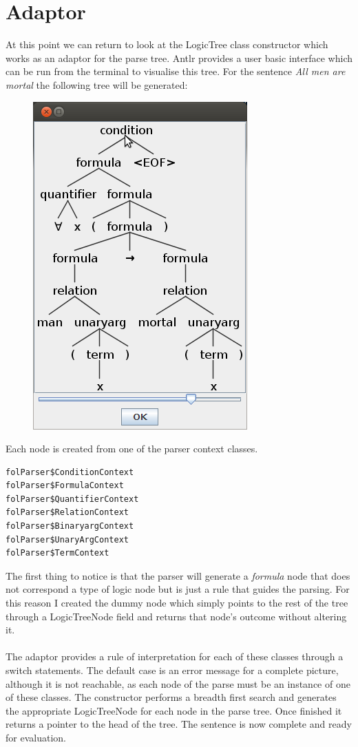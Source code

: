\documentclass{report}
\begin{document}
\section{Adaptor}
At this point we can return to look at the LogicTree class constructor which works as an adaptor for the parse tree. Antlr provides a user basic interface which can be run from the terminal to visualise this tree. For the sentence \emph{All men are mortal} the following tree will be generated:
\begin{figure}[h!]
\centering \includegraphics[scale=0.5]{antlr.png}
\end{figure}
Each node is created from one of the parser context classes. 
\begin{verbatim}
folParser$ConditionContext
folParser$FormulaContext
folParser$QuantifierContext
folParser$RelationContext
folParser$BinaryargContext
folParser$UnaryArgContext
folParser$TermContext
\end{verbatim}
The first thing to notice is that the parser will generate a \emph{formula} node that does not correspond a type of logic node but is just a rule that guides the parsing. For this reason I created the dummy node which simply points to the rest of the tree through a LogicTreeNode field and returns that node's outcome without altering it. \\ \\
The adaptor provides a rule of interpretation for each of these classes through a switch statements. The default case is an error message for a complete picture, although it is not reachable, as each node of the parse must be an instance of one of these classes. The constructor performs a breadth first search and generates the appropriate LogicTreeNode for each node in the parse tree. Once finished it returns a pointer to the head of the tree. The sentence is now complete and ready for evaluation.
\end{document}

